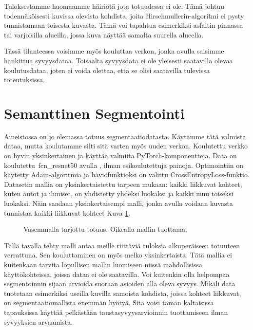 Tuloksestamme huomaamme häiriötä jota totuudessa ei ole.
Tämä johtuu todennäköisesti kuvissa olevista kohdista, joita Hirschmullerin-algoritmi ei pysty tunnistamaan toisesta kuvasta.
Tämä voi tapahtua esimerkiksi asfaltin pinnassa tai varjoisilla alueilla, jossa kuva näyttää samalta suurella alueella.

Tässä tilanteessa voisimme myös kouluttaa verkon, jonka avulla saisimme hankittua syvyysdataa.
Toisaalta syvyysdata ei ole yleisesti saatavilla olevaa koulutusdataa,
joten ei voida olettaa, että se olisi saatavilla tulevissa toteutuksissa. 

\section{Semanttinen Segmentointi}

Aineistossa on jo olemassa totuus segmentaatiodatasta.
Käytämme tätä valmista dataa, mutta koulutamme silti sitä varten myös uuden verkon.
Koulutettu verkko on hyvin yksinkertainen ja käyttää valmiita PyTorch-komponentteja.
Data on koulutettu\ fcn\_resnet50 avulla \cite{pytorchfcnresnet50}, ilman esikoulutettuja painoja. Optimointiin on käytetty Adam-algoritmia ja häviöfunktioksi on valittu CrossEntropyLoss-funktio.
Datasetin mallia on yksinkertaistettu tarpeen mukaan: kaikki liikkuvat kohteet, kuten autot ja ihmiset, on yhdistetty yhdeksi luokaksi ja kaikki muu toiseksi luokaksi.
Näin saadaan yksinkertaisempi malli, jonka avulla voidaan kuvasta tunnistaa kaikki liikkuvat kohteet Kuva \ref{fig:segmentation1}.

\begin{figure}[h]
\centering
{}
\caption[Tämä on lyhyt kuvateksti.]{Vasemmalla tarjottu totuus. Oikealla mallin tuottama.}
\label{fig:segmentation1}
\end{figure}


Tällä tavalla tehty malli antaa meille riittäviä tuloksia alkuperäiseen totuuteen verrattuna.
Sen kouluttaminen on myös melko yksinkertaista.
Tätä mallia ei kuitenkaan tarvita lopullisen mallin luomiseen niissä mahdollisissa käyttökohteissa, joissa dataa ei ole saatavilla.
Voi kuitenkin olla helpompaa segmentoinnin sijaan arvioida suoraan asioiden alla oleva syvyys.
Mikäli data tuotetaan esimerkiksi useilla kuvilla samoista kohdista, joissa kohteet liikkuvat,
on segmentaatiomallista enemmän hyötyä.
Sitä voisi tämän kaltaisissa tapauksissa käyttää pelkästään taustasyvyysarvioinnin tuottamiseen ilman syvyyksien arvaamista.

